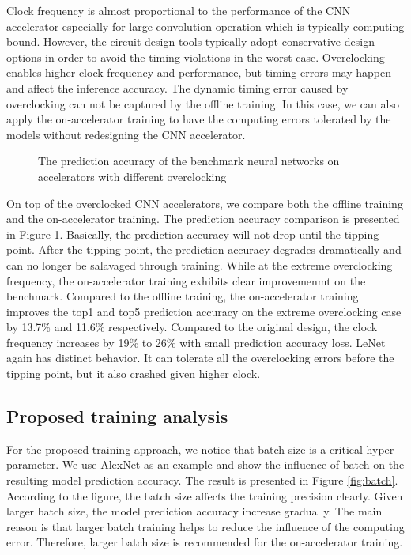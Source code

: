 Clock frequency is almost proportional to the performance of the CNN accelerator 
especially for large convolution operation which is typically computing bound. 
However, the circuit design tools typically adopt conservative design options 
in order to avoid the timing violations in the worst case. Overclocking enables 
higher clock frequency and performance, but timing errors may happen and affect 
the inference accuracy. The dynamic timing error caused by overclocking 
can not be captured by the offline training. In this case, we can also 
apply the on-accelerator training to have the computing errors tolerated 
by the models without redesigning the CNN accelerator.
\begin{figure}
        \center
	\qquad
        \qquad
	\caption{The prediction accuracy of the benchmark neural networks on accelerators with different overclocking}
        \label{fig:overclock-accuracy}
\end{figure}


On top of the overclocked CNN accelerators, we compare both the offline 
training and the on-accelerator training.
The prediction accuracy comparison is presented in Figure \ref{fig:overclock-accuracy}. 
Basically, the prediction accuracy will not drop until the tipping point. After the tipping point, the 
prediction accuracy degrades dramatically and can no longer be salavaged through training.
While at the extreme overclocking frequency, the on-accelerator training exhibits clear 
improvemenmt on the benchmark. Compared to the offline training, 
the on-accelerator training improves the top1 and top5 prediction accuracy 
on the extreme overclocking case by 13.7\% and 11.6\% respectively.
Compared to the original design, the clock frequency 
increases by 19\% to 26\% with small prediction accuracy loss. 
LeNet again has distinct behavior. It can tolerate all the
overclocking errors before the tipping point, but it 
also crashed given higher clock.

\subsection{Proposed training analysis}
For the proposed training approach, we notice that batch size is 
a critical hyper parameter. We use AlexNet as an example and show the influence of batch on the resulting model 
prediction accuracy. The result is presented in Figure \ref{fig:batch}.
According to the figure, the batch size affects the training precision clearly.
Given larger batch size, the model prediction accuracy 
increase gradually. The main reason is that larger batch training helps to 
reduce the influence of the computing error. Therefore, larger batch size is 
recommended for the on-accelerator training.

